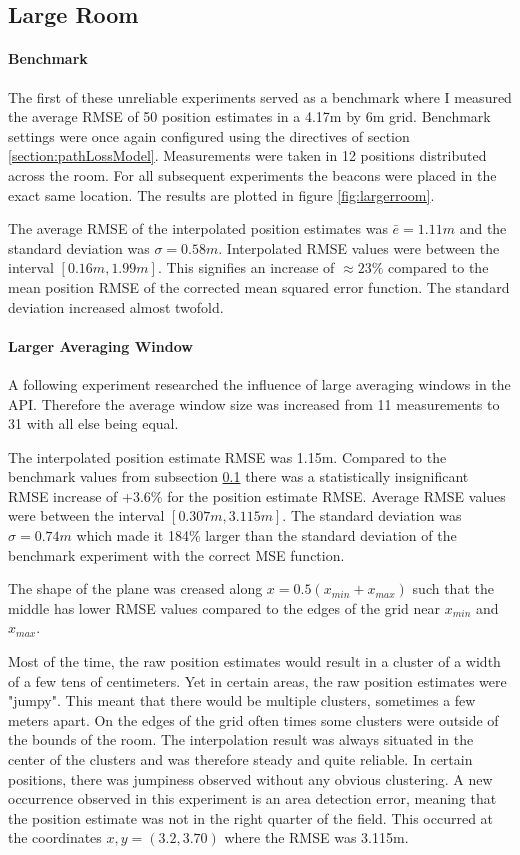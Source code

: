 \documentclass[a4paper, oneside]{ipsreport}
\begin{document}
\subsection{Large Room}
\label{subsection:benchmark}
\paragraph{Benchmark}
The first of these unreliable experiments served as a benchmark where I measured the average RMSE of 50 position estimates in a 4.17m by 6m grid. Benchmark settings were once again configured using the directives of section \ref{section:pathLossModel}. Measurements were taken in 12 positions distributed across the room. For all subsequent experiments the beacons were placed in the exact same location. The results are plotted in figure \ref{fig:largerroom}.

The average RMSE of the interpolated position estimates was $\bar{e} = 1.11 m$ and the standard deviation was $\sigma = 0.58m$. Interpolated RMSE values were between the interval $[0.16 m, 1.99 m]$. This signifies an increase of $\approx 23\%$ compared to the mean position RMSE of the corrected mean squared error function. The standard deviation increased almost twofold.

\paragraph{Larger Averaging Window}
A following experiment researched the influence of large averaging windows in the API. Therefore the average window size was increased from 11 measurements to 31 with all else being equal.

The interpolated position estimate RMSE was 1.15m. Compared to the benchmark values from subsection \ref{subsection:benchmark} there was a statistically insignificant RMSE increase of +3.6\% for the position estimate RMSE. Average RMSE values were between the interval $[0.307 m, 3.115m]$. The standard deviation was $\sigma = 0.74m$ which made it 184\% larger than the standard deviation of the benchmark experiment with the correct MSE function.

The shape of the plane was creased along $x=0.5(x_{min}+x_{max})$ such that the middle has lower RMSE values compared to the edges of the grid near $x_{min}$ and $x_{max}$.

Most of the time, the raw position estimates would result in a cluster of a width of a few tens of centimeters. Yet in certain areas, the raw position estimates were "jumpy". This meant that there would be multiple clusters, sometimes a few meters apart. On the edges of the grid often times some clusters were outside of the bounds of the room. The interpolation result was always situated in the center of the clusters and was therefore steady and quite reliable. In certain positions, there was jumpiness observed without any obvious clustering. A new occurrence observed in this experiment is an area detection error, meaning that the position estimate was not in the right quarter of the field. This occurred at the coordinates $x,y = (3.2, 3.70)$ where the RMSE was 3.115m.
\end{document}
